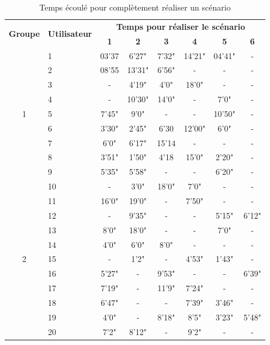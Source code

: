 \documentclass{EPL-master-thesis-covers-FR}
\begin{document}
				\begin{table}
					\centering
					\begin{tabular}{|c|l|c|c|c|c|c|c|}
						\hline
						 \multirow{2}{*}{\textbf{Groupe}} &\multirow{2}{*}{\textbf{Utilisateur}} & \multicolumn{6}{|c|}{\textbf{Temps pour réaliser le scénario}} \\ \cline{3-8}
						 &  & \textbf{1}  & \textbf{2} & \textbf{3} & \textbf{4} & \textbf{5} & \textbf{6}\\ \cline{1-8}
						 \multirow{9}{*}{1} & 1 & 03'37 & 6'27" & 7'32" & 14'21" & 04'41" & - \\ \cline{2-8}
						 & 2 & 08'55 & 13'31" & 6'56" & - & - & - \\ \cline{2-8}
						 & 3 & - & 4'19" & 4'0" & 18'0" & - & - \\ \cline{2-8}
						 & 4 & - & 10'30" & 14'0" & - & 7'0" & - \\ \cline{2-8}
						 & 5 & 7'45" & 9'0" & - & - & 10'50" & - \\ \cline{2-8}
						 & 6 & 3'30" & 2'45" & 6'30 & 12'00" & 6'0" & - \\ \cline{2-8}
						 & 7 & 6'0" & 6'17" & 15'14 & - & - & - \\ \cline{2-8}
						 & 8 & 3'51" & 1'50" & 4'18 & 15'0" & 2'20" & - \\ \cline{2-8}
						 & 9 & 5'35" & 5'58" & - & - & 6'20" & - \\ \cline{1-8}
						 \multirow{11}{*}{2} & 10 & - & 3'0" & 18'0" & 7'0" & - & - \\ \cline{2-8}
						 & 11 & 16'0" & 19'0" & - & 7'50" & - & - \\ \cline{2-8}
						 & 12 & - & 9'35" & - & - & 5'15" & 6'12" \\ \cline{2-8}
						 & 13 & 8'0" & 18'0" & - & - & 7'0" & - \\ \cline{2-8}
						 & 14 & 4'0" & 6'0" & 8'0" & - & - & - \\ \cline{2-8}
						 & 15 & - & 1'2" & - & 4'53" & 1'43" & - \\ \cline{2-8}
						 & 16 & 5'27" & - & 9'53" & - & - & 6'39" \\ \cline{2-8}
						 & 17 & 7'19" & - & 11'9" & 7'24" & - & - \\ \cline{2-8}
						 & 18 & 6'47" & - & - & 7'39" & 3'46" & - \\ \cline{2-8}
						 & 19 & 4'0" & - & 8'18" & 8'5" & 3'23" & 5'48" \\ \cline{2-8}
						 & 20 & 7'2" & 8'12" & - & 9'2" & - & - \\ \cline{1-8}
					\end{tabular}
					\caption{Temps écoulé pour complètement réaliser un scénario}
					\label{tab:validation_times}
				\end{table}
\end{document}
